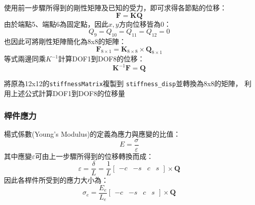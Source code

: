 \documentclass[12pt,a4paper]{article}
\begin{document}
            使用前一步驟所得到的剛性矩陣及已知的受力，即可求得各節點的位移：
            \begin{displaymath}
                \mathbf{F} = \mathbf{K}\mathbf{Q}
            \end{displaymath}
            由於端點5、端點6為固定點，因此$x,y$方向位移皆為0：
            \begin{displaymath}
                Q_9=Q_{10}=Q_{11}=Q_{12}=0
            \end{displaymath}
            也因此可將剛性矩陣簡化為8x8的矩陣：
            \begin{displaymath}
                \mathbf{F}_{8\times1} = \mathbf{K}_{8\times8}\times\mathbf{Q}_{8\times1}
            \end{displaymath}
            等式兩邊同乘$K^{-1}$計算DOF1到DOF8的位移：
            \begin{displaymath}
                \mathbf{K}^{-1}\mathbf{F} = \mathbf{Q}
            \end{displaymath}

            將原為12x12的\texttt{stiffnessMatrix}複製到
            \texttt{stiffness\_disp}並轉換為8x8的矩陣，
            利用上述公式計算DOF1到DOF8的位移量
            

        \subsubsection{桿件應力}

            楊式係數(Young's Modulus)的定義為應力與應變的比值：
            \begin{displaymath}
                E = \frac{\sigma}{\varepsilon}
            \end{displaymath}
            其中應變$\varepsilon$可由上一步驟所得到的位移轉換而成：
            \begin{displaymath}
                \varepsilon = \frac{\delta}{L} = \frac{1}{L}\left[
                \begin{array}{cccc}
                    -c & -s & c & s
                \end{array}
                \right]\times\mathbf{Q}
            \end{displaymath}
            因此各桿件所受到的應力大小為：
            \begin{displaymath}
                \sigma_e = \frac{E_e}{L_e}\left[
                    \begin{array}{cccc}
                        -c & -s & c & s
                    \end{array}
                    \right]\times\mathbf{Q}
            \end{displaymath}
\end{document}
